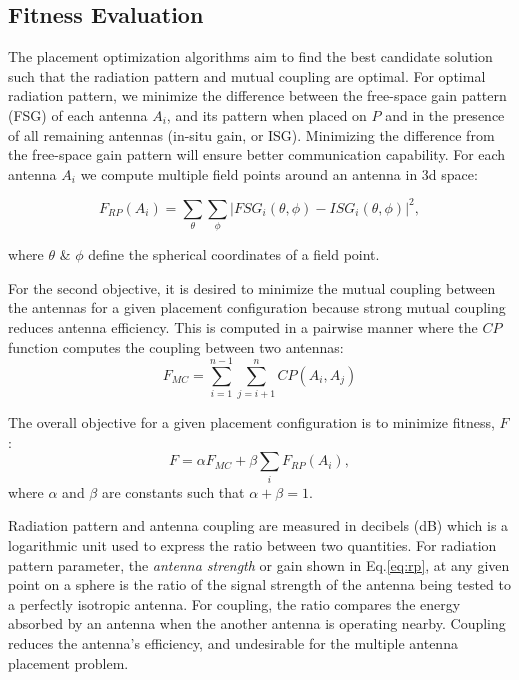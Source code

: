 \documentclass[conference]{IEEEtran}
\begin{document}
\subsection{Fitness Evaluation}
The placement optimization algorithms aim to find the best candidate solution such that the radiation pattern and mutual coupling are optimal. For optimal radiation pattern, we minimize the difference between the free-space gain pattern (FSG) of each antenna $A_i$, and its pattern when placed on $P$ and in the presence of all remaining antennas (in-situ gain, or ISG). Minimizing the difference from the free-space gain pattern will ensure better communication capability. For each antenna $A_i$ we compute multiple field points around an antenna in 3d space:

\begin{equation} \label{eq:rp}
  F_{RP}(A_i) = \sum_{\theta}\sum_{\phi} 
           \left| FSG_i(\theta,\phi) - ISG_i(\theta,\phi) \right| ^2,
\end{equation}

where $\theta$ \& $\phi$ define the spherical coordinates of a field point.

For the second objective, it is desired to minimize the mutual coupling between the antennas for a given placement configuration because strong mutual coupling reduces antenna efficiency. This is computed in a pairwise manner where the $CP$ function computes the coupling between two antennas:
\begin{equation}
  F_{MC} = \sum_{i=1}^{n-1}\sum_{j=i+1}^{n} CP(A_i, A_j)
\end{equation}

The overall objective for a given placement configuration is to minimize fitness, $F$:
\begin{equation} \label{eq:optimal}
  F = \alpha F_{MC} + \beta \sum_{i} F_{RP}(A_i),
\end{equation}
where $\alpha$ and $\beta$ are constants such that $\alpha + \beta = 1$.

Radiation pattern and antenna coupling are measured in decibels (dB) which is a logarithmic unit used to express the ratio between two quantities. For radiation pattern parameter, the \textit{antenna strength} or gain shown in Eq.\eqref{eq:rp}, at any given point on a sphere is the ratio of the signal strength of the antenna being tested to a perfectly isotropic antenna. For coupling, the ratio compares the energy absorbed by an antenna when the another antenna is operating nearby. Coupling reduces the antenna's efficiency, and undesirable for the multiple antenna placement problem.
\end{document}
